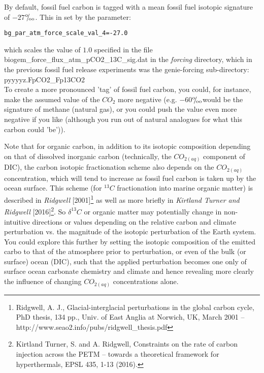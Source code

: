 \documentclass[11pt,fleqn]{book} %
\def\permille{\ensuremath{{}^\text{o}\mkern-5mu/\mkern-3mu_\text{oo}}}
\begin{document}
By default, fossil fuel carbon is tagged with a mean fossil fuel isotopic signature of \(-27\)\permille. This in set by the parameter:
\vspace{-1mm}\begin{verbatim}
bg_par_atm_force_scale_val_4=-27.0
\end{verbatim}\vspace{-1mm}
which scales the value of \(1.0\) specified in the file \textsf{\footnotesize biogem\_force\_flux\_atm\_pCO2\_13C\_sig.dat} in the \textit{forcing} directory, which in the previous fossil fuel release experiments was the \textsf{\footnotesize genie-forcing} sub-directory:
\vspace{2pt}
\\\noindent \footnotesize\textsf{pyyyyz.FpCO2\_Fp13CO2}\normalsize
\vspace{2pt}
\\To create a more pronounced 'tag' of fossil fuel carbon, you could, for instance, make the assumed value of the \(CO_{2}\) more negative (e.g. \(-60\)\permille would be the signature of methane (natural gas), or you could push the value even more negative if you like (although you run out of natural analogues for what this carbon could 'be')).

Note that for organic carbon, in addition to its isotopic composition depending on that of dissolved inorganic carbon (technically, the \(CO_{2(aq)}\) component of DIC), the carbon isotopic fractionation scheme also depends on the \(CO_{2(aq)}\) concentration, which will tend to increase as fossil fuel carbon is taken up by the ocean surface. This scheme (for \(^{13}C\) fractionation into marine organic matter) is described in \textit{Ridgwell} [2001]\footnote{Ridgwell, A. J., Glacial-interglacial perturbations in the global carbon cycle, PhD thesis, 134 pp., Univ. of East Anglia at Norwich, UK, March 2001 -- http://www.seao2.info/pubs/ridgwell\_thesis.pdf} as well as more briefly in \textit{Kirtland Turner and Ridgwell} [2016]\footnote{Kirtland Turner, S. and A. Ridgwell, Constraints on the rate of carbon injection across the PETM – towards a theoretical framework for hyperthermals, EPSL 435, 1-13 (2016).}. So \(\delta^{13}C\) or organic matter may potentially change in non-intuitive directions or values depending on the relative carbon and climate perturbation vs. the magnitude of the isotopic perturbation of the Earth system. You could explore this further by setting the isotopic composition of the emitted carbo to that of the atmosphere prior to perturbation, or even of the bulk (or surface) ocean (DIC), such that the applied perturbation becomes one only of surface ocean carbonate chemistry and climate and hence revealing more clearly the influence of changing  \(CO_{2(aq)}\) concentrations alone.
\end{document}
